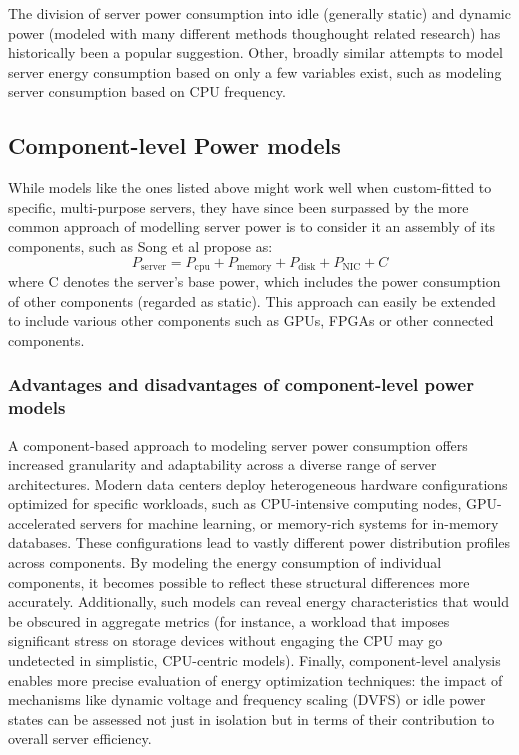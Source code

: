 The division of server power consumption into idle (generally static) and dynamic power (modeled with many different methods thoughought related research) has historically been a popular suggestion\parencite{beloglazovChapter3Taxonomy2011}. Other, broadly similar attempts to model server energy consumption based on only a few variables exist, such as modeling server consumption based on CPU frequency\parencite{elnozahyEnergyEfficientServerClusters2003}.

\subsection{Component-level Power models}

While models like the ones listed above might work well when custom-fitted to specific, multi-purpose servers, they have since been surpassed by the more common approach of modelling server power is to consider it an assembly of its components, such as Song et al\parencite{song2013unified} propose as:
\begin{equation}
    P_{\text{server}} = P_{\text{cpu}} + P_{\text{memory}} + P_{\text{disk}} + P_{\text{NIC}} + C
\end{equation}
where C denotes the server's base power, which includes the power consumption of other components (regarded as static). This approach can easily be extended to include various other components such as GPUs, FPGAs or other connected components.

\subsubsection{Advantages and disadvantages of component-level power models}
A component-based approach to modeling server power consumption offers increased granularity and adaptability across a diverse range of server architectures. Modern data centers deploy heterogeneous hardware configurations optimized for specific workloads, such as CPU-intensive computing nodes, GPU-accelerated servers for machine learning, or memory-rich systems for in-memory databases. These configurations lead to vastly different power distribution profiles across components\parencite{katalEnergyEfficiencyCloud2022}. By modeling the energy consumption of individual components, it becomes possible to reflect these structural differences more accurately. Additionally, such models can reveal energy characteristics that would be obscured in aggregate metrics (for instance, a workload that imposes significant stress on storage devices without engaging the CPU may go undetected in simplistic, CPU-centric models). Finally, component-level analysis enables more precise evaluation of energy optimization techniques: the impact of mechanisms like dynamic voltage and frequency scaling (DVFS) or idle power states can be assessed not just in isolation but in terms of their contribution to overall server efficiency.

